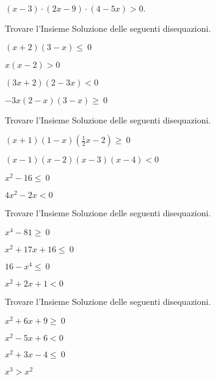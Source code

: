 \begin{esercizio}
 \label{ese:21.43}
 \((x-3)\cdot (2x-9)\cdot (4-5x)>0.\)
\end{esercizio}

\begin{esercizio}[\Ast]
 \label{ese:21.44}
Trovare l'Insieme Soluzione delle seguenti disequazioni.
\begin{multicols}{2}
 \begin{enumeratea}
 \item \((x+2)(3-x)\le~0\)
\item \(x(x-2)>0\)
\item \((3x+2)(2-3x)<0\)
\item \(-3x(2-x)(3-x)\ge~0\)
\end{enumeratea}
\end{multicols}
\end{esercizio}
\newpage
\begin{esercizio}[\Ast]
 \label{ese:21.45}
Trovare l'Insieme Soluzione delle seguenti disequazioni.
\begin{multicols}{2}
 \begin{enumeratea}
 \item \((x+1)(1-x)\left(\frac{1}{2}x-2\right)\ge~0\)
\item \((x-1)(x-2)(x-3)(x-4)<0\)
\item \(x^{2}-16\le~0\)
\item \(4x^{2}-2x<0\)
\end{enumeratea}
\end{multicols}
\end{esercizio}

\begin{esercizio}[\Ast]
 \label{ese:21.46}
Trovare l'Insieme Soluzione delle seguenti disequazioni.
\begin{multicols}{2}
 \begin{enumeratea}
 \item \(x^{4}-81\ge~0\)
\item \(x^{2}+17x+16\le~0\)
\item \(16-x^{4}\le~0\)
\item \(x^{2}+2x+1<0\)
\end{enumeratea}
\end{multicols}
\end{esercizio}

\begin{esercizio}[\Ast]
 \label{ese:21.47}
Trovare l'Insieme Soluzione delle seguenti disequazioni.
\begin{multicols}{2}
 \begin{enumeratea}
 \item \(x^{2}+6x+9\ge~0\)
\item \(x^{2}-5x+6<0\)
\item \(x^{2}+3x-4\le~0\)
\item \(x^{3}>x^{2}\)
\end{enumeratea}
\end{multicols}
\end{esercizio}

